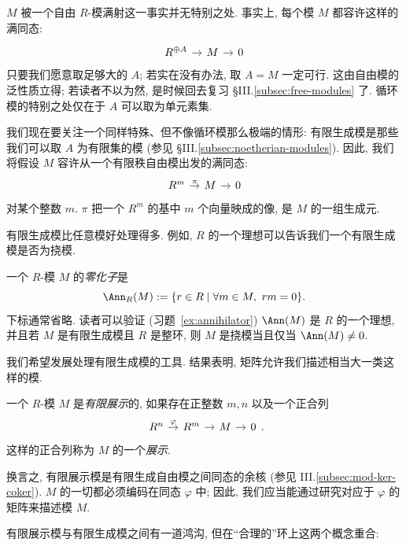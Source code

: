 $M$ 被一个自由 $R$-模满射这一事实并无特别之处. 事实上, 每个模 $M$ 都容许这样的满同态:
$$
\begin{tikzcd}[column sep=.9em]
R^{\oplus A} \ar[r] & M \ar[r] & 0
\end{tikzcd}
$$
只要我们愿意取足够大的 $A$; 若实在没有办法, 取 $A=M$ 一定可行. 这由自由模的泛性质立得; 若读者不以为然, 是时候回去复习 §III.\ref{subsec:free-modules} 了. 循环模的特别之处仅在于 $A$ 可以取为单元素集.

我们现在要关注一个同样特殊、但不像循环模那么极端的情形: 有限生成模是那些我们可以取 $A$ 为有限集的模 (参见 §III.\ref{subsec:noetherian-modules}). 因此, 我们将假设 $M$ 容许从一个有限秩自由模出发的满同态:
$$
\begin{tikzcd}[column sep=.9em]
R^m \ar[r,"\pi"] & M \ar[r] & 0
\end{tikzcd}
$$
对某个整数 $m$. $\pi$ 把一个 $R^m$ 的基中 $m$ 个向量映成的像, 是 $M$ 的一组生成元.

有限生成模比任意模好处理得多. 例如, $R$ 的一个理想可以告诉我们一个有限生成模是否为挠模.

\begin{definition}\label{def:annihilator}
一个 $R$-模 $M$ 的\emph{零化子}是
$$
\Ann_R(M):=\{r\in R\mid \forall m\in M,\ rm=0\}.
$$
下标通常省略. 读者可以验证 (习题~\ref{ex:annihilator}) $\Ann(M)$ 是 $R$ 的一个理想, 并且若 $M$ 是有限生成模且 $R$ 是整环, 则 $M$ 是挠模当且仅当 $\Ann(M)\neq 0$.
\end{definition}

我们希望发展处理有限生成模的工具. 结果表明, 矩阵允许我们描述相当大一类这样的模.

\begin{definition}\label{def:finitely-presented}
一个 $R$-模 $M$ 是\emph{有限展示}的, 如果存在正整数 $m,n$ 以及一个正合列
$$
\begin{tikzcd}[column sep=.9em]
R^n \ar[r,"\varphi"] & R^m \ar[r] & M \ar[r] & 0
\end{tikzcd}.
$$
这样的正合列称为 $M$ 的一个\emph{展示}.
\end{definition}

换言之, 有限展示模是有限生成自由模之间同态的余核 (参见 III.\ref{subsec:mod-ker-coker}). $M$ 的一切都必须编码在同态 $\varphi$ 中; 因此, 我们应当能通过研究对应于 $\varphi$ 的矩阵来描述模 $M$.

有限展示模与有限生成模之间有一道鸿沟, 但在“合理的”环上这两个概念重合:


